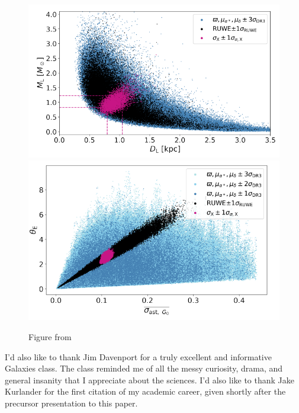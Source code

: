 \documentclass[twocolumn]{aastex631}
\begin{document}
\begin{figure}
	\includegraphics[width=\columnwidth]{microlensingsimMD.png}
	\includegraphics[width=\columnwidth]{microlensingsimTheta.png}
	\caption{Figure from \cite{jablonskaThere2022}}
\end{figure}

\begin{acknowledgements}
I'd also like to thank Jim Davenport for a truly excellent and informative Galaxies class. The class reminded me of all the messy curiosity, drama, and general insanity that I appreciate about the sciences. I'd also like to thank Jake Kurlander for the first citation of my academic career, given shortly after the precursor presentation to this paper.
\end{acknowledgements}



{}



\end{document}
